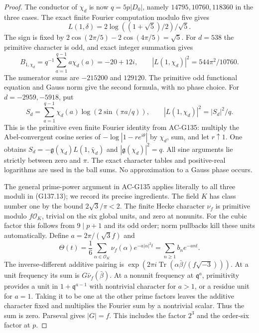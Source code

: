 \begin{proof}
The conductor of $\chi_d$ is now $q=5p|D_0|$, namely
$14795,10760,118360$ in the three cases.
The exact finite Fourier computation modulo five gives
\[
                L(1,\delta)=2\log((1+\sqrt5)/2)/\sqrt5.
 \tag{G137.14}
\]
The sign is fixed by
$2\cos(2\pi/5)-2\cos(4\pi/5)=\sqrt5$.
For $d=538$ the primitive character is odd, and exact integer
summation gives
\[
 B_{1,\chi_d}=q^{-1}\sum_{a=1}^{q-1}a\chi_d(a)=-20+12i,
 \qquad |L(1,\chi_d)|^2=544\pi^2/10760.
 \tag{G137.15}
\]
The numerator sums are $-215200$ and $129120$.
The primitive odd functional equation and Gauss norm give the
second formula, with no phase choice.
For $d=-2959,-5918$, put
\[
 S_d=\sum_{a=1}^{q-1}\chi_d(a)\log(2\sin(\pi a/q)),
 \qquad |L(1,\chi_d)|^2=|S_d|^2/q.
 \tag{G137.16}
\]
This is the primitive even finite Fourier identity from AC-G135:
multiply the Abel-convergent cosine series of
$-\log|1-re^{i\theta}|$ by $\chi_d$, sum, and let $r\uparrow1$.
One obtains $S_d=-\mathfrak g(\chi_d)L(1,\bar\chi_d)$ and
$|\mathfrak g(\chi_d)|^2=q$.
All sine arguments lie strictly between zero and $\pi$.
The exact character tables and positive-real logarithms are used
in the ball sums.  No approximation to a Gauss phase occurs.

The general prime-power argument in AC-G135 applies literally to
all three moduli in (G137.13); we record its precise ingredients.
The field $K$ has class number one by the bound
$2\sqrt3/\pi<2$.
The finite Hecke character $\nu_f$ is primitive modulo
$f\mathcal O_K$, trivial on the six global units, and zero at
nonunits.  For the cubic factor this follows from $9\mid p+1$
and its odd order; norm pullbacks kill these units automatically.
Define $a=2\pi/(\sqrt3f)$ and
\[
 \Theta(t)=\frac16\sum_{\alpha\in\mathcal O_K}
       \nu_f(\alpha)e^{-a|\alpha|^2t}
       =\sum_{n\ge1}b_n e^{-ant}.
 \tag{G137.17}
\]
The inverse-different additive pairing is
$\exp(2\pi i\operatorname{Tr}(\alpha\bar\beta/(f\sqrt{-3})))$.
At a unit frequency its sum is $G\bar\nu_f(\bar\beta)$.
At a nonunit frequency at $\mathfrak q^a$, primitivity provides
a unit in $1+\mathfrak q^{a-1}$ with nontrivial character for
$a>1$, or a residue unit for $a=1$.  Taking it to be one at the
other prime factors leaves the additive character fixed and
multiplies the Fourier sum by a nontrivial scalar.  Thus the
sum is zero.  Parseval gives $|G|=f$.
This includes the factor $2^3$ and the order-six factor at $p$.


\end{proof}
